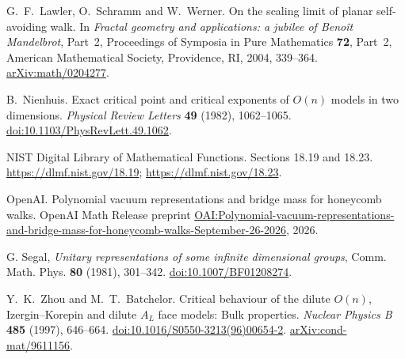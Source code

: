 G.~F.~Lawler, O.~Schramm and W.~Werner.
On the scaling limit of planar self-avoiding walk.
In \emph{Fractal geometry and applications: a jubilee of Beno\^it Mandelbrot},
Part~2, Proceedings of Symposia in Pure Mathematics \textbf{72}, Part~2,
American Mathematical Society, Providence, RI, 2004, 339--364.
\href{https://arxiv.org/abs/math/0204277}{arXiv:math/0204277}.

B.~Nienhuis.
Exact critical point and critical exponents of $O(n)$ models in two dimensions.
\emph{Physical Review Letters} \textbf{49} (1982), 1062--1065.
\href{https://doi.org/10.1103/PhysRevLett.49.1062}{doi:10.1103/PhysRevLett.49.1062}.

NIST Digital Library of Mathematical Functions.
Sections 18.19 and 18.23.
\url{https://dlmf.nist.gov/18.19};
\url{https://dlmf.nist.gov/18.23}.

OpenAI.
Polynomial vacuum representations and bridge mass for honeycomb walks.
OpenAI Math Release preprint
\href{https://github.com/openai/math/blob/main/preprints/Polynomial-vacuum-representations-and-bridge-mass-for-honeycomb-walks-September-26-2026/main.pdf}{OAI:Polynomial-vacuum-representations-and-bridge-mass-for-honeycomb-walks-September-26-2026},
2026.

G. Segal,
\emph{Unitary representations of some infinite dimensional groups},
Comm. Math. Phys. \textbf{80} (1981), 301--342.
\href{https://doi.org/10.1007/BF01208274}{doi:10.1007/BF01208274}.

Y.~K.~Zhou and M.~T.~Batchelor.
Critical behaviour of the dilute $O(n)$, Izergin--Korepin and dilute
$A_L$ face models: Bulk properties.
\emph{Nuclear Physics B} \textbf{485} (1997), 646--664.
\href{https://doi.org/10.1016/S0550-3213(96)00654-2}{doi:10.1016/S0550-3213(96)00654-2}.
\href{https://arxiv.org/abs/cond-mat/9611156}{arXiv:cond-mat/9611156}.

